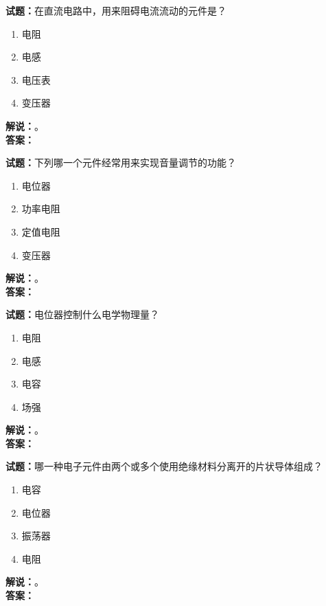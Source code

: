 \documentclass{ctexbook}
\begin{document}
\vspace{\baselineskip}

\noindent\textbf{试题：}在直流电路中，用来阻碍电流流动的元件是？
\begin{enumerate}[leftmargin=3em]
  \item 电阻
  \item 电感
  \item 电压表
  \item 变压器
\end{enumerate}
\noindent\textbf{解说：}\textbf{}。\\\noindent\textbf{答案：}

\vspace{\baselineskip}

\noindent\textbf{试题：}下列哪一个元件经常用来实现音量调节的功能？
\begin{enumerate}[leftmargin=3em]
  \item 电位器
  \item 功率电阻
  \item 定值电阻
  \item 变压器
\end{enumerate}
\noindent\textbf{解说：}\textbf{}。\\\noindent\textbf{答案：}

\vspace{\baselineskip}

\noindent\textbf{试题：}电位器控制什么电学物理量？
\begin{enumerate}[leftmargin=3em]
  \item 电阻
  \item 电感
  \item 电容
  \item 场强
\end{enumerate}
\noindent\textbf{解说：}\textbf{}。\\\noindent\textbf{答案：}

\vspace{\baselineskip}

\noindent\textbf{试题：}哪一种电子元件由两个或多个使用绝缘材料分离开的片状导体组成？
\begin{enumerate}[leftmargin=3em]
  \item 电容
  \item 电位器
  \item 振荡器
  \item 电阻
\end{enumerate}
\noindent\textbf{解说：}\textbf{}。\\\noindent\textbf{答案：}
\end{document}
